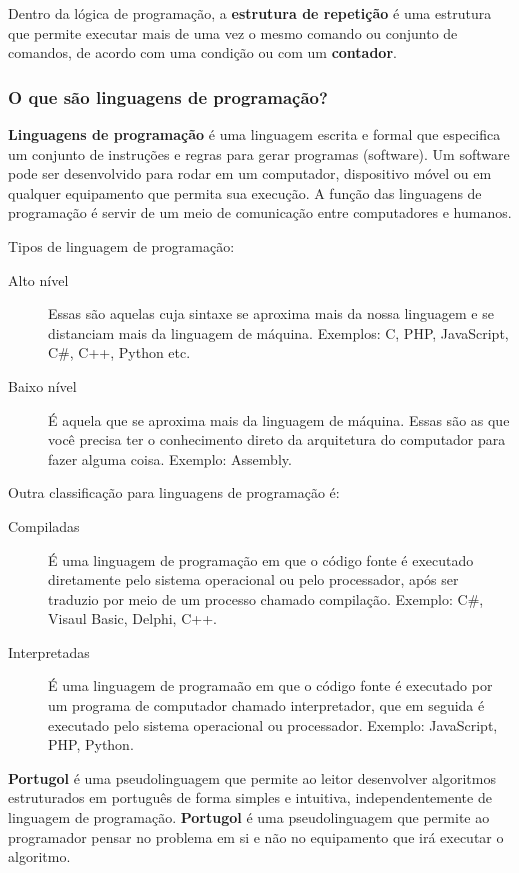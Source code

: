 \documentclass[12pt,a4paper]{article}
\begin{document}
	Dentro da lógica de programação, a \textbf{estrutura de repetição} é uma estrutura que permite executar mais de uma vez o mesmo comando ou conjunto de comandos, de acordo com uma condição ou com um \textbf{contador}. 
	
	\subsubsection{O que são linguagens de programação?}
	
	\textbf{Linguagens de programação} é uma linguagem escrita e formal que especifica um conjunto de instruções e regras para gerar programas (software). Um software pode ser desenvolvido para rodar em um computador, dispositivo móvel ou em qualquer equipamento que permita sua execução. A função das linguagens de programação é servir de um meio de comunicação entre computadores e humanos.
	
	Tipos de linguagem de programação:
	
	\begin{description}
		\item[Alto nível] Essas são aquelas cuja sintaxe se aproxima mais da nossa linguagem e se distanciam mais da linguagem de máquina. Exemplos: C, PHP, JavaScript, C\#, C++, Python etc.
		
		\item[Baixo nível] É aquela que se aproxima mais da linguagem de máquina. Essas são as que você precisa ter o conhecimento direto da arquitetura do computador para fazer alguma coisa. Exemplo: Assembly.
	\end{description}
	
	Outra classificação para linguagens de programação é:
	
	\begin{description}
		\item[Compiladas] É uma linguagem de programação em que o código fonte é executado diretamente pelo sistema operacional ou pelo processador, após ser traduzio por meio de um processo chamado compilação. Exemplo: C\#, Visaul Basic, Delphi, C++.
		
		\item[Interpretadas] É uma linguagem de programaão em que o código fonte é executado por um programa de computador chamado interpretador, que em seguida é executado pelo sistema operacional ou processador. Exemplo: JavaScript, PHP, Python.
	\end{description}
	
	\textbf{Portugol} é uma pseudolinguagem que permite ao leitor desenvolver algoritmos estruturados em português de forma simples e intuitiva, independentemente de linguagem de programação. \textbf{Portugol} é uma pseudolinguagem que permite ao programador pensar no problema em si e não no equipamento que irá executar o algoritmo.
	
\end{document}
